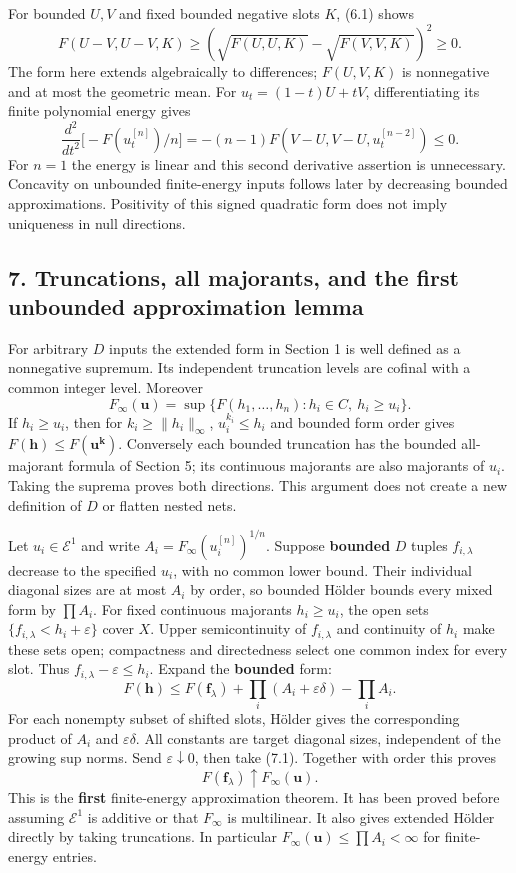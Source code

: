 \documentclass[
]{article}
\begin{document}
For bounded \(U,V\) and fixed bounded negative slots \(K\), (6.1) shows
\[F(U-V,U-V,K)\ge(\sqrt{F(U,U,K)}-\sqrt{F(V,V,K)})^2\ge0.\] The form
here extends algebraically to differences; \(F(U,V,K)\) is nonnegative
and at most the geometric mean. For \(u_t=(1-t)U+tV\), differentiating
its finite polynomial energy gives
\[\frac{d^2}{dt^2}\big[-F(u_t^{[n]})/n\big]=-(n-1)F(V-U,V-U,u_t^{[n-2]})\le0.\]
For \(n=1\) the energy is linear and this second derivative assertion is
unnecessary. Concavity on unbounded finite-energy inputs follows later
by decreasing bounded approximations. Positivity of this signed
quadratic form does not imply uniqueness in null directions.

\subsection{7. Truncations, all majorants, and the first unbounded
approximation
lemma}\label{truncations-all-majorants-and-the-first-unbounded-approximation-lemma}

For arbitrary \(D\) inputs the extended form in Section 1 is well
defined as a nonnegative supremum. Its independent truncation levels are
cofinal with a common integer level. Moreover
\[F_\infty(\boldsymbol u)=\sup\{F(h_1,\ldots,h_n):h_i\in C,\ h_i\ge u_i\}.\tag{7.1}\]
If \(h_i\ge u_i\), then for \(k_i\ge\|h_i\|_\infty\),
\(u_i^{k_i}\le h_i\) and bounded form order gives
\(F(\boldsymbol h)\le F(\boldsymbol u^{\boldsymbol k})\). Conversely
each bounded truncation has the bounded all-majorant formula of Section
5; its continuous majorants are also majorants of \(u_i\). Taking the
suprema proves both directions. This argument does not create a new
definition of \(D\) or flatten nested nets.

Let \(u_i\in\mathcal E^1\) and write \(A_i=F_\infty(u_i^{[n]})^{1/n}\).
Suppose \textbf{bounded} \(D\) tuples \(f_{i,\lambda}\) decrease to the
specified \(u_i\), with no common lower bound. Their individual diagonal
sizes are at most \(A_i\) by order, so bounded Hölder bounds every mixed
form by \(\prod A_i\). For fixed continuous majorants \(h_i\ge u_i\),
the open sets \(\{f_{i,\lambda}<h_i+\varepsilon\}\) cover \(X\). Upper
semicontinuity of \(f_{i,\lambda}\) and continuity of \(h_i\) make these
sets open; compactness and directedness select one common index for
every slot. Thus \(f_{i,\lambda}-\varepsilon\le h_i\). Expand the
\textbf{bounded} form:
\[F(\boldsymbol h)\le F(\boldsymbol f_\lambda)+\prod_i(A_i+\varepsilon\delta)-\prod_i A_i.\]
For each nonempty subset of shifted slots, Hölder gives the
corresponding product of \(A_i\) and \(\varepsilon\delta\). All
constants are target diagonal sizes, independent of the growing sup
norms. Send \(\varepsilon\downarrow0\), then take (7.1). Together with
order this proves
\[F(\boldsymbol f_\lambda)\uparrow F_\infty(\boldsymbol u).\tag{7.2}\]
This is the \textbf{first} finite-energy approximation theorem. It has
been proved before assuming \(\mathcal E^1\) is additive or that
\(F_\infty\) is multilinear. It also gives extended Hölder directly by
taking truncations. In particular
\(F_\infty(\boldsymbol u)\le\prod A_i<\infty\) for finite-energy
entries.
\end{document}
